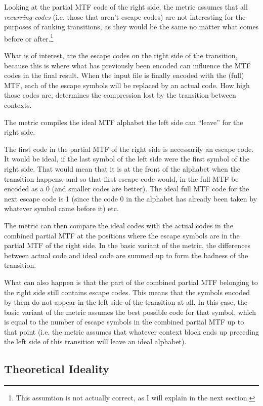 \documentclass[a4paper]{scrreprt}
\begin{document}
Looking at the partial MTF code of the right side, the metric assumes that all
\emph{recurring codes} (i.e. those that aren't escape codes) are not interesting
for the purposes of ranking transitions, as they would be the same no matter
what comes before or after.\footnote{This assumtion is not actually correct, as
I will explain in the next section.}

What is of interest, are the escape codes on the right side of the transition,
because this is where what has previously been encoded can influence the MTF
codes in the final result. When the input file is finally encoded with the
(full) MTF, each of the escape symbols will be replaced by an actual code. How
high those codes are, determines the compression lost by the transition between
contexts.

The metric compiles the ideal MTF alphabet the left side can ``leave'' for the
right side.

The first code in the partial MTF of the right side is necessarily an escape
code. It would be ideal, if the last symbol of the left side were the first
symbol of the right side. That would mean that it is at the front of the
alphabet when the transition happens, and so that first escape code would, in
the full MTF be encoded as a 0 (and smaller codes are better). The ideal full
MTF code for the next escape code is 1 (since the code 0 in the alphabet has
already been taken by whatever symbol came before it) etc.

The metric can then compare the ideal codes with the actual codes in the
combined partial MTF at the positions where the escape symbols are in the
partial MTF of the right side. In the basic variant of the metric, the
differences between actual code and ideal code are summed up to form the badness
of the transition.

What can also happen is that the part of the combined partial MTF belonging to
the right side still contains escape codes. This means that the symbols encoded
by them do not appear in the left side of the transition at all. In this case,
the basic variant of the metric assumes the best possible code for that symbol,
which is equal to the number of escape symbols in the combined partial MTF up to
that point (i.e. the metric assumes that whatever context block ends up
preceding the left side of this transition will leave an ideal alphabet).

\subsection{Theoretical Ideality}
\end{document}
